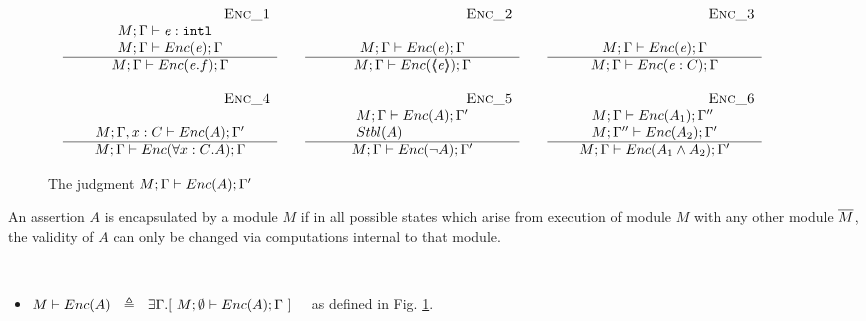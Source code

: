 \begin{figure}[thb]
$
\begin{array}{l}
\begin{array}{lclcl}
\begin{array}{c} \strut \ \ \ \ \ \ \ \ \ \ \ \ \ \ \ \ \ \ \ \ \ \ \ \ \ \ \ \ \ \ \ {{\mbox{~ \strut  {\sc{Enc\_1}}}}} \\   
\begin{array}{l}
M; \Gamma \vdash \mathit{e} : \mbox{\normalfont{\texttt{intl}}} \\
M; \Gamma \vdash {\ensuremath Enc( \mathit{e})}; \Gamma
\end{array}
 \\ \hline 
M; \Gamma \vdash {\ensuremath Enc( \mathit{e}.f )}; \Gamma
 \end{array}
& &
\begin{array}{c} \strut \ \ \ \ \ \ \ \ \ \ \ \ \ \ \ \ \ \ \ \ \ \ \ \ \ \ \ \ \ \ \ {{\mbox{~ \strut  {\sc{Enc\_2}}}}} \\   
\\
M; \Gamma \vdash {\ensuremath Enc( \mathit{e})}; \Gamma 
 \\ \hline 
M; \Gamma \vdash {\ensuremath Enc( \ensuremath{\langle\!\!\langle \mathit{e} \rangle\!\!\rangle} )}; \Gamma
 \end{array}
& &
\begin{array}{c} \strut \ \ \ \ \ \ \ \ \ \ \ \ \ \ \ \ \ \ \ \ \ \ \ \ \ \ \ \ \ \ \ {{\mbox{~ \strut  {\sc{Enc\_3}}}}} \\   
\\
M; \Gamma \vdash {\ensuremath Enc( \mathit{e})}; \Gamma 
 \\ \hline 
M; \Gamma \vdash {\ensuremath Enc( \mathit{e}:C )}; \Gamma
 \end{array}
\\ \\ 
\begin{array}{c} \strut \ \ \ \ \ \ \ \ \ \ \ \ \ \ \ \ \ \ \ \ \ \ \ \ \ \ \ \ \ \ \ {{\mbox{~ \strut  {\sc{Enc\_4}}}}} \\   
\\
M; \Gamma, {x:C} \vdash {\ensuremath Enc( A )}; \Gamma' 
 \\ \hline 
M; \Gamma \vdash {\ensuremath Enc( \forall {x:C}. A )}; \Gamma
 \end{array}
&   &
\begin{array}{c} \strut \ \ \ \ \ \ \ \ \ \ \ \ \ \ \ \ \ \ \ \ \ \ \ \ \ \ \ \ \ \ \ {{\mbox{~ \strut  {\sc{Enc\_5}}}}} \\    
\begin{array}{l}
M; \Gamma \vdash {\ensuremath Enc( A )}; \Gamma'\\  {Stbl( A )}
\end{array}
 \\ \hline 
M; \Gamma \vdash {\ensuremath Enc(  \neg A )}; \Gamma'  
 \end{array}
&    &
\begin{array}{c} \strut \ \ \ \ \ \ \ \ \ \ \ \ \ \ \ \ \ \ \ \ \ \ \ \ \ \ \ \ \ \ \ {{\mbox{~ \strut  {\sc{Enc\_6}}}}} \\   
\begin{array}{l}
M; \Gamma \vdash {\ensuremath Enc( A_1 )}; \Gamma''   \\
  M; \Gamma'' \vdash {\ensuremath Enc(  A_2 )}; \Gamma' 
  \end{array} 
 \\ \hline 
M; \Gamma \vdash {\ensuremath Enc( A_1 \wedge A_2 )}; \Gamma'
 \end{array}
\end{array}
\end{array}
$
\caption{The judgment $M; \Gamma \vdash {\ensuremath Enc( A )}; \Gamma'$}
\label{f:encaps}
\end{figure}

{An assertion $A$  is  encapsulated by a module $M$  if in all possible states which arise from execution of module $M$ with any other  module $\overline{M}$, the validity of $A$}  {can only be changed via computations internal to that module}.
 

\begin{definition} $~$ \\
\label{d:encaps:sytactic}
\begin{itemize}
\item 
$M \vdash \encaps{A}  \ \   \triangleq  \ \  \exists \Gamma.[\ M; \emptyset \vdash \encaps{A}; \Gamma\ ]$ \ \  as defined in Fig. \ref{f:encaps}.
 \end{itemize}
  \end{definition}
  


